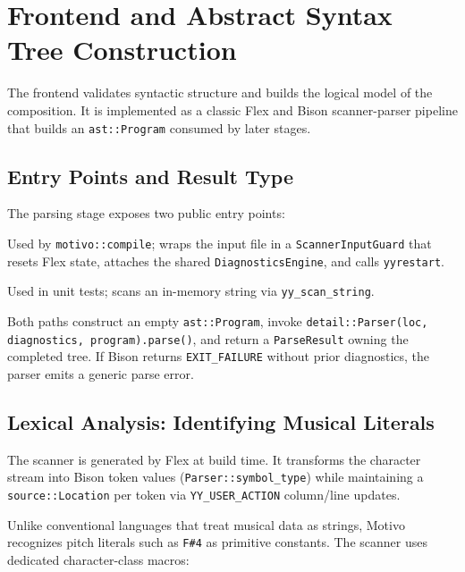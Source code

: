 \section{Frontend and Abstract Syntax Tree Construction}\label{sec:implementation-frontend}

The frontend validates syntactic structure and builds the logical model of the composition.
It is implemented as a classic Flex and Bison scanner-parser pipeline that builds an \texttt{ast::Program}
consumed by later
stages.

\subsection{Entry Points and Result Type}\label{detail-subsec:frontend-entry-points}

The parsing stage exposes two public entry points:

 Used by \texttt{motivo::compile}; wraps
the input file in a \texttt{ScannerInputGuard} that resets Flex state, attaches the shared
\texttt{DiagnosticsEngine}, and calls \texttt{yyrestart}.

 Used in unit tests; scans an in-memory
string via \texttt{yy\_scan\_string}.

Both paths construct an empty \texttt{ast::Program}, invoke \texttt{detail::Parser(loc, diagnostics,
program).parse()}, and return a \texttt{ParseResult} owning the completed tree.
If Bison returns \texttt{EXIT\_FAILURE} without prior diagnostics, the parser emits a generic parse error.

\subsection{Lexical Analysis: Identifying Musical
Literals}\label{detail-subsec:lexical-analysis:-identifying-musical-literals}

The scanner is generated by Flex at build time.
It transforms the character stream into Bison token values (\texttt{Parser::symbol\_type}) while maintaining a
\texttt{source::Location} per token via \texttt{YY\_USER\_ACTION} column/line updates.


Unlike conventional languages that treat musical data as strings, Motivo recognizes pitch literals such as
\texttt{F\#4} as primitive constants.
The scanner uses dedicated character-class macros:

